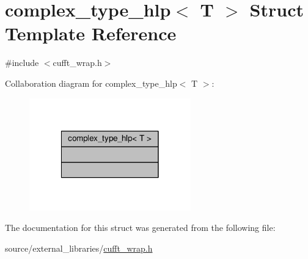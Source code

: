 \hypertarget{structcomplex__type__hlp}{\section{complex\-\_\-type\-\_\-hlp$<$ T $>$ Struct Template Reference}
\label{structcomplex__type__hlp}
}


{\ttfamily \#include $<$cufft\-\_\-wrap.\-h$>$}



Collaboration diagram for complex\-\_\-type\-\_\-hlp$<$ T $>$\-:
\nopagebreak
\begin{figure}[H]
\begin{center}
\leavevmode
\includegraphics[width=198pt]{structcomplex__type__hlp__coll__graph}
\end{center}
\end{figure}


The documentation for this struct was generated from the following file\-:\begin{DoxyCompactItemize}
\item 
source/external\-\_\-libraries/\hyperlink{cufft__wrap_8h}{cufft\-\_\-wrap.\-h}\end{DoxyCompactItemize}
